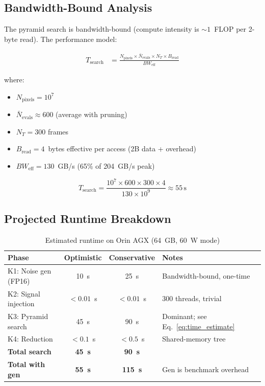 \documentclass[11pt,letterpaper]{article}
\begin{document}
\subsection{Bandwidth-Bound Analysis}

The pyramid search is bandwidth-bound (compute intensity is
${\sim}1$~FLOP per 2-byte read). The performance model:

\begin{align}
    T_{\text{search}} &= \frac{N_{\text{pixels}} \times
    \bar{N}_{\text{evals}} \times N_T \times B_{\text{read}}}
    {BW_{\text{eff}}} \label{eq:time_model}
\end{align}

where:
\begin{itemize}[nosep]
    \item $N_{\text{pixels}} = 10^7$
    \item $\bar{N}_{\text{evals}} \approx 600$ (average with pruning)
    \item $N_T = 300$ frames
    \item $B_{\text{read}} = 4$~bytes effective per access (2B data + overhead)
    \item $BW_{\text{eff}} = 130$~GB/s (65\% of 204~GB/s peak)
\end{itemize}

\begin{equation}
    T_{\text{search}} = \frac{10^7 \times 600 \times 300 \times 4}{130 \times 10^9}
    \approx 55\,\text{s}
    \label{eq:time_estimate}
\end{equation}

\subsection{Projected Runtime Breakdown}

\begin{table}[h]
\centering
\caption{Estimated runtime on Orin AGX (64~GB, 60~W mode)}
\label{tab:runtime}
\begin{tabular}{lccl}
\toprule
\textbf{Phase} & \textbf{Optimistic} & \textbf{Conservative} & \textbf{Notes} \\
\midrule
K1: Noise gen (FP16)     & 10~s   & 25~s   & Bandwidth-bound, one-time \\
K2: Signal injection     & $<0.01$~s & $<0.01$~s & 300 threads, trivial \\
K3: Pyramid search       & 45~s   & 90~s   & Dominant; see Eq.~\eqref{eq:time_estimate} \\
K4: Reduction            & $<0.1$~s & $<0.5$~s & Shared-memory tree \\
\midrule
\textbf{Total search}    & \textbf{45~s}   & \textbf{90~s} & \\
\textbf{Total with gen}  & \textbf{55~s}   & \textbf{115~s} & Gen is benchmark overhead \\
\bottomrule
\end{tabular}
\end{table}
\end{document}
